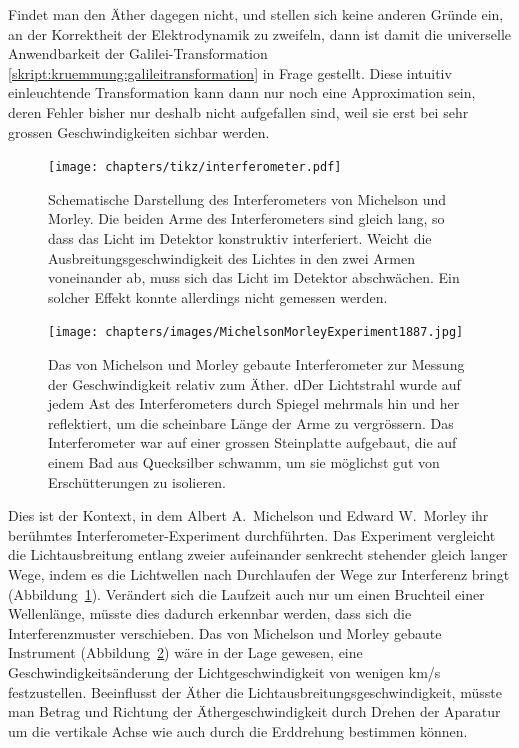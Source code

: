 Findet man den Äther dagegen nicht, und stellen sich keine anderen Gründe
ein, an der Korrektheit der Elektrodynamik zu zweifeln, dann ist damit
die universelle Anwendbarkeit der Galilei-Transformation 
\eqref{skript:kruemmung:galileitransformation} in Frage gestellt.
Diese intuitiv einleuchtende Transformation kann dann nur noch eine
Approximation sein, deren Fehler bisher nur deshalb nicht aufgefallen
sind, weil sie erst bei sehr grossen Geschwindigkeiten sichbar werden.

\begin{figure}
\centering
\texttt{[image: chapters/tikz/interferometer.pdf]}
\caption{Schematische Darstellung des Interferometers von Michelson und Morley.
Die beiden Arme des Interferometers sind gleich lang, so dass das Licht
im Detektor konstruktiv interferiert.
Weicht die Ausbreitungsgeschwindigkeit des Lichtes in den zwei Armen
voneinander ab, muss sich das Licht im Detektor abschwächen.
Ein solcher Effekt konnte allerdings nicht gemessen werden.
\label{skript:speziell:interferometerprinzip}}
\end{figure}

\begin{figure}
\centering
\texttt{[image: chapters/images/MichelsonMorleyExperiment1887.jpg]}
\caption{Das von Michelson und Morley gebaute Interferometer zur Messung
der Geschwindigkeit relativ zum Äther.
dDer Lichtstrahl wurde auf jedem Ast des Interferometers durch Spiegel
mehrmals hin und her reflektiert, um die scheinbare Länge der Arme
zu vergrössern.
Das Interferometer war auf einer grossen Steinplatte aufgebaut, die auf einem
Bad aus Quecksilber schwamm, um sie möglichst gut von Erschütterungen zu
isolieren.
\label{MMinterferometer}}
\end{figure}
Dies ist der Kontext, in dem Albert A.~Michelson und Edward W.~Morley
%
%
%
%
ihr berühmtes Interfero\-meter-Experiment durchführten.
Das Experiment vergleicht die Lichtausbreitung entlang zweier aufeinander
senkrecht stehender gleich langer Wege, indem es die Lichtwellen nach 
Durchlaufen der Wege zur Interferenz bringt
(Abbildung~\ref{skript:speziell:interferometerprinzip}).
Verändert sich die Laufzeit auch nur um einen Bruchteil einer Wellenlänge,
müsste dies dadurch erkennbar werden, dass sich die Interferenzmuster
verschieben.
Das von Michelson und Morley gebaute Instrument
(Abbildung~\ref{MMinterferometer}) wäre in der Lage
gewesen, eine Geschwindigkeitsänderung der Lichtgeschwindigkeit von
wenigen km/s festzustellen.
Beeinflusst der Äther die Lichtausbreitungsgeschwindigkeit, müsste 
man Betrag und Richtung der Äthergeschwindigkeit durch Drehen der
Aparatur um die vertikale Achse wie auch durch die Erddrehung
bestimmen können.

